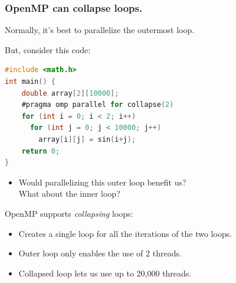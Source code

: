 \begin{frame}[fragile]
  \frametitle{OpenMP can collapse loops.}


  \begin{changemargin}{2cm}
\large
Normally, it's best to parallelize the outermost loop.
  
But, consider this code:

  \begin{lstlisting}[language=C,morekeywords={foreach,pragma,omp,parallel,single,nowait,task,untied,barrier,taskyield}]
#include <math.h>
int main() {
    double array[2][10000];
    #pragma omp parallel for collapse(2)
    for (int i = 0; i < 2; i++)
      for (int j = 0; j < 10000; j++)
        array[i][j] = sin(i+j);
    return 0;
}
  \end{lstlisting}


  \begin{itemize}
  \item Would parallelizing this outer loop benefit us?\\
    What about the inner loop?
  \end{itemize}

  OpenMP supports \emph{collapsing} loops:

  \begin{itemize}
    \item Creates a single loop for all the iterations of the two loops.
    \item Outer loop only enables the use of 2 threads.
    \item Collapsed loop lets us use up to 20,000 threads.
  \end{itemize}
  \end{changemargin}
  

\end{frame}


